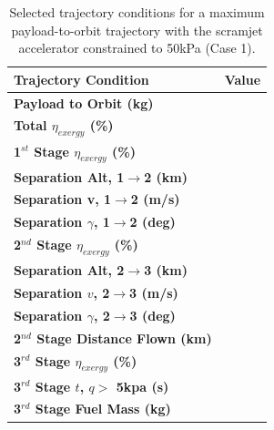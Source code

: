 \begin{table}[ht]%
	\centering
	
	\begin{tabular}{l c } 
		\hline \textbf{Trajectory Condition}
		&Value
		\\
		\hline \textbf{Payload to Orbit (kg)}
		& \textbf{\PayloadToOrbitConstqNoReturn}
		\\
		\textbf{Total $\eta_{exergy}$ (\%)}
		& \textbf{\totalExergyEffConstqNoReturn}
		\\
		\hline 
		\textbf{1$^{st}$ Stage $\eta_{exergy}$ (\%)}
		& \textbf{\firstExergyEffConstqNoReturn}
		\\
	
		\textbf{Separation Alt, 1$\rightarrow$2 (km)}
		& \firstsecondSeparationAltConstqNoReturn
		\\
		\textbf{Separation v, 1$\rightarrow$2 (m/s)}
		& \firstsecondSeparationvConstqNoReturn
		\\
		\textbf{Separation $\gamma$, 1$\rightarrow$2 (deg)}
		& \firstsecondSeparationgammaConstqNoReturn
		\\
		\hline 
		\textbf{2$^{nd}$ Stage $\eta_{exergy}$ (\%)}
		& \textbf{\secondExergyEffConstqNoReturn}
		\\
		\textbf{Separation Alt, 2$\rightarrow$3 (km)}
		& \secondthirdSeparationAltConstqNoReturn
		\\
		\textbf{Separation $v$, 2$\rightarrow$3 (m/s)}
		& \secondthirdSeparationvConstqNoReturn
		\\
		\textbf{Separation $\gamma$, 2$\rightarrow$3 (deg)}
		& \secondthirdSeparationgammaConstqNoReturn
		\\
		\textbf{2$^{nd}$ Stage Distance Flown (km)}
		& \SecondDistConstqNoReturn
		\\
		\hline 
		\textbf{3$^{rd}$ Stage $\eta_{exergy}$ (\%)}
		& \textbf{\thirddExergyEffConstqNoReturn}
		\\
	
		\textbf{3$^{rd}$ Stage $t$, $q >$ 5kpa (s)}
		& \thirdqOverFiveConstqNoReturn
		\\
		\textbf{3$^{rd}$ Stage Fuel Mass (kg)}
		& \thirdmFuelConstqNoReturn
		\\
		\hline 
	\end{tabular} 
	
	\caption{Selected trajectory conditions for a maximum payload-to-orbit trajectory with the scramjet accelerator constrained to 50kPa (Case 1).}
	\label{tab:constqsummary} %
\end{table}
